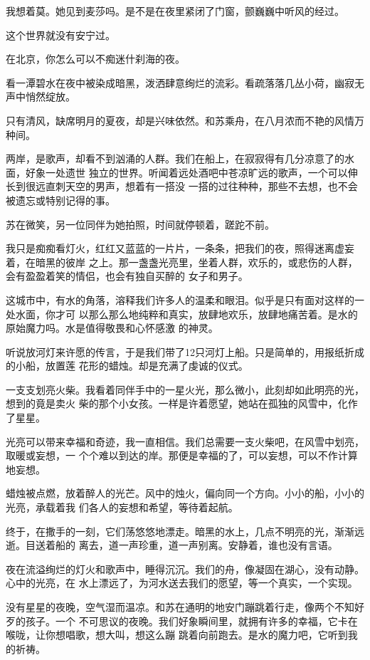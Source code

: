 \documentclass[12pt,a4paper]{article}
\begin{document}
		我想着莫。她见到麦莎吗。是不是在夜里紧闭了门窗，颤巍巍中听风的经过。


		这个世界就没有安宁过。

	\endwriting



		在北京，你怎么可以不痴迷什刹海的夜。

		看一潭碧水在夜中被染成暗黑，泼洒肆意绚烂的流彩。看疏落落几丛小荷，幽寂无声中悄然绽放。

		只有清风，缺席明月的夏夜，却是兴味依然。和苏乘舟，在八月浓而不艳的风情万种间。

		两岸，是歌声，却看不到汹涌的人群。我们在船上，在寂寂得有几分凉意了的水面，好象一处遗世
	独立的世界。听闻着远处酒吧中苍凉旷远的歌声，一个可以伸长到很远直刺天空的男声，想着有一搭没
	一搭的过往种种，那些不去想，也不会被遗忘或特别记得的事。

		苏在微笑，另一位同伴为她拍照，时间就停顿着，蹉跎不前。

		我只是痴痴看灯火，红红又蓝蓝的一片片，一条条，把我们的夜，照得迷离虚妄着，在暗黑的彼岸
	之上。那一盏盏光亮里，坐着人群，欢乐的，或悲伤的人群，会有盈盈着笑的情侣，也会有独自买醉的
	女子和男子。

		这城市中，有水的角落，溶释我们许多人的温柔和眼泪。似乎是只有面对这样的一处水面，你才可
	以那么那么地纯粹和真实，放肆地欢乐，放肆地痛苦着。是水的原始魔力吗。水是值得敬畏和心怀感激
	的神灵。

		听说放河灯来许愿的传言，于是我们带了12只河灯上船。只是简单的，用报纸折成的小船，放置莲
	花形的蜡烛。却是充满了虔诚的仪式。

		一支支划亮火柴。我看着同伴手中的一星火光，那么微小，此刻却如此明亮的光，想到的竟是卖火
	柴的那个小女孩。一样是许着愿望，她站在孤独的风雪中，化作了星星。

		光亮可以带来幸福和奇迹，我一直相信。我们总需要一支火柴吧，在风雪中划亮，取暖或妄想，一
	个个难以到达的岸。那便是幸福的了，可以妄想，可以不作计算地妄想。

		蜡烛被点燃，放着醉人的光芒。风中的烛火，偏向同一个方向。小小的船，小小的光亮，承载着我
	们各人的妄想和希望，等待着起航。

		终于，在撒手的一刻，它们荡悠悠地漂走。暗黑的水上，几点不明亮的光，渐渐远逝。目送着船的
	离去，道一声珍重，道一声别离。安静着，谁也没有言语。

		夜在流溢绚烂的灯火和歌声中，睡得沉沉。我们的舟，像凝固在湖心，没有动静。心中的光亮，在
	水上漂远了，为河水送去我们的愿望，等一个真实，一个实现。

		没有星星的夜晚，空气湿而温凉。和苏在通明的地安门蹦跳着行走，像两个不知好歹的孩子。一个
	不可思议的夜晚。我们好象瞬间里，就拥有许多的幸福，它卡在喉咙，让你想唱歌，想大叫，想这么蹦
	跳着向前跑去。是水的魔力吧，它听到我的祈祷。
\end{document}
